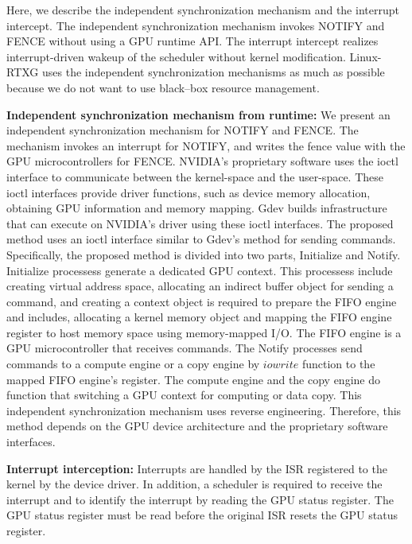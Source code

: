 Here, we describe the independent synchronization mechanism and the interrupt intercept.
The independent synchronization mechanism invokes NOTIFY and FENCE without using a GPU runtime API.
The interrupt intercept realizes interrupt-driven wakeup of the scheduler without kernel modification.
Linux-RTXG uses the independent synchronization mechanisms as much as possible
because we do not want to use black--box resource management.

\textbf{Independent synchronization mechanism from runtime:}
We present an independent synchronization mechanism for NOTIFY and FENCE.
The mechanism invokes an interrupt for NOTIFY, and writes the fence value with the GPU microcontrollers for FENCE.
NVIDIA's proprietary software uses the ioctl interface to communicate between the kernel-space and the user-space.
These ioctl interfaces provide driver functions, such as device memory allocation, obtaining GPU information and memory mapping.
Gdev builds infrastructure that can execute on NVIDIA's driver using these ioctl interfaces.
The proposed method uses an ioctl interface similar to Gdev's method for sending commands.
Specifically, the proposed method is divided into two parts, Initialize and Notify.
Initialize processess generate a dedicated GPU context.
This processess include creating virtual address space, allocating an indirect buffer object for sending a command, and creating a context object is required to prepare the FIFO engine and includes, allocating a kernel memory object and mapping the FIFO engine register to host memory space using memory-mapped I/O.
The FIFO engine is a GPU microcontroller that receives commands.
The Notify processes send commands to a compute engine or a copy engine by $iowrite$ function to the mapped FIFO engine's register.
The compute engine and the copy engine do function that switching a GPU context for computing or data copy.
This independent synchronization mechanism uses reverse engineering.
Therefore, this method depends on the GPU device architecture and the proprietary software interfaces.

\textbf{Interrupt interception:}
Interrupts are handled by the ISR registered to the kernel by the device driver.
In addition, a scheduler is required to receive the interrupt and to identify the interrupt by reading the GPU status register.
The GPU status register must be read before the original ISR resets the GPU status register.


